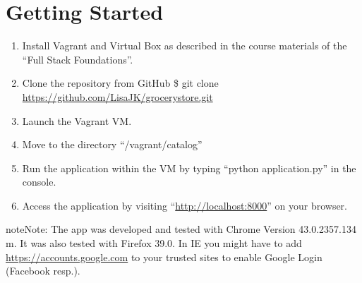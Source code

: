 \documentclass[letterpaper,10pt,english]{sphinxmanual}
\begin{document}
\chapter{Getting Started}
\label{index:getting-started}\begin{enumerate}
\item {} 
Install Vagrant and Virtual Box as described in the course materials of the
``Full Stack Foundations''.

\item {} 
Clone the repository from GitHub
\$ git clone \href{https://github.com/LisaJK/grocerystore.git}{https://github.com/LisaJK/grocerystore.git}

\item {} 
Launch the Vagrant VM.

\item {} 
Move to the directory ``/vagrant/catalog''

\item {} 
Run the application within the VM by typing ``python application.py'' in the
console.

\item {} 
Access the application by visiting ``\href{http://localhost:8000}{http://localhost:8000}'' on your browser.

\end{enumerate}

\begin{notice}{note}{Note:}
The app was developed and tested with Chrome Version 43.0.2357.134 m.
It was also tested with Firefox 39.0.
In IE you might have to add \href{https://accounts.google.com}{https://accounts.google.com} to your trusted sites
to enable Google Login (Facebook resp.).
\end{notice}
\end{document}

